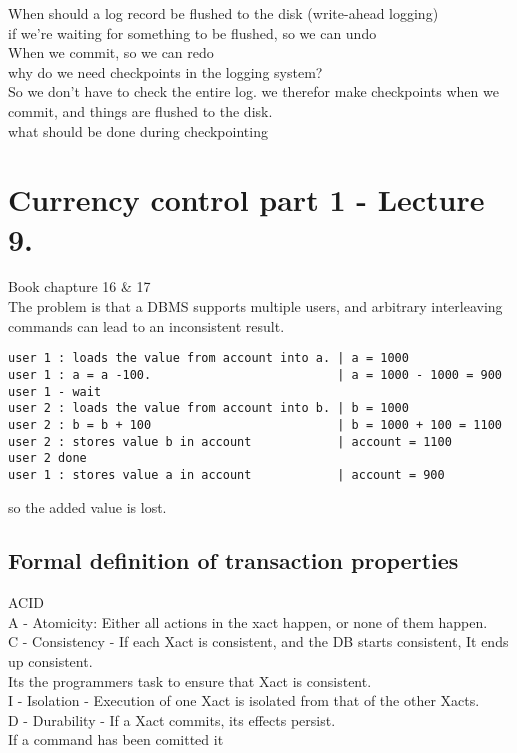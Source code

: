 \documentclass[a4paper,10pt,titlepage]{report}
\begin{document}
When should a log record be flushed to the disk (write-ahead logging) \\
\hspace{10mm}	if we're waiting for something to be flushed, so we can undo \\
\hspace{10mm}	When we commit, so we can redo \\

why do we need checkpoints in the logging system? \\
\hspace{10mm}	So we don't have to check the entire log. we therefor make checkpoints when we commit, and things are flushed to the disk. \\

what should be done during checkpointing \\
	






	

\section{Currency control part 1 - Lecture 9.}
Book chapture 16 \& 17
\\
The problem is that a DBMS supports multiple users, and arbitrary interleaving commands can lead to an inconsistent result.\\

\begin{lstlisting}[frame=single]
user 1 : loads the value from account into a. | a = 1000
user 1 : a = a -100.                          | a = 1000 - 1000 = 900
user 1 - wait
user 2 : loads the value from account into b. | b = 1000
user 2 : b = b + 100                          | b = 1000 + 100 = 1100
user 2 : stores value b in account            | account = 1100
user 2 done
user 1 : stores value a in account            | account = 900
\end{lstlisting}
so the added value is lost.


\subsection{Formal definition of transaction properties}
ACID\\
A - Atomicity: Either all actions in the xact happen, or none of them happen. \\
C - Consistency - If each Xact is consistent, and the DB starts consistent, It ends up consistent. \\
\hspace{10mm} Its the programmers task to ensure that Xact is consistent. \\
I - Isolation - Execution of one Xact is isolated from that of the other Xacts.\\
D -	Durability - If a Xact commits, its effects persist.\\
\hspace{10mm} If a command has been comitted it 
\end{document}
